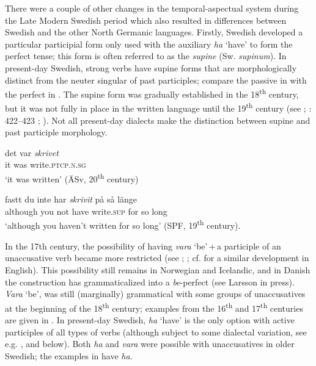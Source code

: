 \documentclass[output=paper]{langscibook}
\begin{document}
There were a couple of other changes in the temporal-aspectual system during the Late Modern Swedish period which also resulted in differences between Swedish and the other North Germanic languages. Firstly, Swedish developed a particular participial form only used with the auxiliary \textit{ha} ‘have’ to form the perfect tense; this form is often referred to as the \textit{supine} (Sw. \textit{supinum}). In present-day Swedish, strong verbs have supine forms that are morphologically distinct from the neuter singular of past participles; compare the passive in  with the perfect in . The supine form was gradually established in the 18\textsuperscript{th} century, but it was not fully in place in the written language until the 19\textsuperscript{th} century (see \citealt{Platzack1981}; \citealt{Larsson2009}: 422–423 ; \citealt{Backstrom2019}). Not all present-day dialects make the distinction between supine and past participle morphology.


\ea\label{ex:intro:7}
\ea\label{ex:intro:7a}
\gll  det    var \textit{skrivet} \\
it   was write.\textsc{ptcp.n.sg}\\
\glt    ‘it was written’ (ÄSv, 20\textsuperscript{th} century)


\ex\label{ex:intro:7b}
\gll  fastt       du   inte   har \textit{skrivit}  på   så   länge\\
      although   you   not   have   write.\textsc{sup}   for   so long\\
\glt    ‘although you haven’t written for so long’ (SPF, 19\textsuperscript{th} century).
\z
\z


In the 17th century, the possibility of having \textit{vara} ‘be’\,+\,a participle of an unaccusative verb became more restricted (see \citealt{Johannisson1945}; \citealt{Larsson2009,Larsson2015, Larsson2009}; cf. \citealt{McFaddenAlexiadou2005} for a similar development in English). This possibility still remains in Norwegian and Icelandic, and in Danish the construction has grammaticalized into a \textit{be}{}-perfect (see Larsson in press). \textit{Vara} ‘be’, was still (marginally) grammatical with some groups of unaccusatives at the beginning of the 18\textsuperscript{th} century; examples from the 16\textsuperscript{th} and 17\textsuperscript{th} centuries are given in . In present-day Swedish, \textit{ha} ‘have’ is the only option with active participles of all types of verbs (although subject to some dialectal variation, see e.g. \citealt{Larsson2014HAVE}, and  below). Both \textit{ha} and \textit{vara} were possible with unaccusatives in older Swedish; the examples in  have \textit{ha}.
\end{document}
